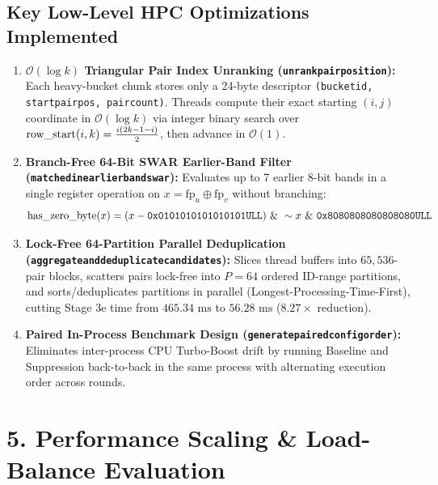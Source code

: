 \documentclass[10pt,a4paper]{article}
\renewcommand{\_}{\textunderscore\allowbreak}
\begin{document}
\vspace{0.2em}
\subsection*{Key Low-Level HPC Optimizations Implemented}
\footnotesize
\begin{enumerate}[leftmargin=1.4em]
    \item \textbf{$\mathcal{O}(\log k)$ Triangular Pair Index Unranking (\texttt{unrank\_pair\_position}):} Each heavy-bucket chunk stores only a 24-byte descriptor \texttt{(bucket\_id, start\_pair\_pos, pair\_count)}. Threads compute their exact starting $(i,j)$ coordinate in $\mathcal{O}(\log k)$ via integer binary search over $\text{row\_start}(i,k) = \frac{i(2k-1-i)}{2}$, then advance in $\mathcal{O}(1)$.
    \item \textbf{Branch-Free 64-Bit SWAR Earlier-Band Filter (\texttt{matched\_in\_earlier\_band\_swar}):} Evaluates up to 7 earlier 8-bit bands in a single register operation on $x = \text{fp}_u \oplus \text{fp}_v$ without branching:
    $$\text{has\_zero\_byte}(x) = (x - \texttt{0x0101010101010101ULL}) \ \& \ \sim x \ \& \ \texttt{0x8080808080808080ULL}$$
    \item \textbf{Lock-Free 64-Partition Parallel Deduplication (\texttt{aggregate\_and\_deduplicate\_candidates}):} Slices thread buffers into $65,536$-pair blocks, scatters pairs lock-free into $P=64$ ordered ID-range partitions, and sorts/deduplicates partitions in parallel (Longest-Processing-Time-First), cutting Stage 3e time from $465.34\text{ ms}$ to $56.28\text{ ms}$ ($8.27\times$ reduction).
    \item \textbf{Paired In-Process Benchmark Design (\texttt{generate\_paired\_config\_order}):} Eliminates inter-process CPU Turbo-Boost drift by running Baseline and Suppression back-to-back in the same process with alternating execution order across rounds.
\end{enumerate}

\newpage

\section{5. Performance Scaling \& Load-Balance Evaluation}
\end{document}
